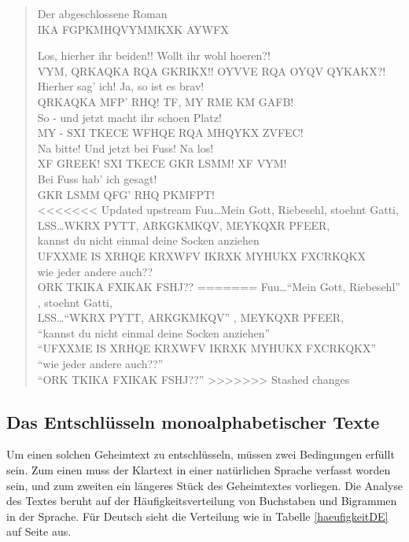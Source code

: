 \documentclass[%
<<<<<<< Updated upstream
11pt,%
twoside,%
titlepage,%
german,%
headsepline%
]{scrartcl}
\begin{document}
\begin{quote}
Der abgeschlossene Roman\\
IKA FGPKMHQVYMMKXK AYWFX

Los, hierher ihr beiden!! Wollt ihr wohl hoeren?!\\
VYM, QRKAQKA RQA GKRIKX!! OYVVE RQA OYQV QYKAKX?!\\
Hierher sag' ich! Ja, so ist es brav!\\
QRKAQKA MFP' RHQ! TF, MY RME KM GAFB!\\
So - und jetzt macht ihr schoen Platz!\\
MY - SXI TKECE WFHQE RQA MHQYKX ZVFEC!\\
Na bitte! Und jetzt bei Fuss! Na los!\\
XF GREEK! SXI TKECE GKR LSMM! XF VYM!\\
Bei Fuss hab' ich gesagt!\\
GKR LSMM QFG' RHQ PKMFPT!\\
<<<<<<< Updated upstream
Fuu\dots  \glqq Mein Gott, Riebesehl\glqq , stoehnt Gatti,\\
LSS\dots  \glqq WKRX PYTT, ARKGKMKQV\glqq , MEYKQXR PFEER,\\
\glqq kannst du nicht einmal deine Socken anziehen\\
\glqq UFXXME IS XRHQE KRXWFV IKRXK MYHUKX FXCRKQKX\\
 wie jeder andere auch??\glqq \\
 ORK TKIKA FXIKAK FSHJ??\glqq
=======
Fuu\dots  \enquote{Mein Gott, Riebesehl} , stoehnt Gatti,\\
LSS\dots  \enquote{WKRX PYTT, ARKGKMKQV} , MEYKQXR PFEER,\\
\enquote{kannst du nicht einmal deine Socken anziehen}\\
\enquote{UFXXME IS XRHQE KRXWFV IKRXK MYHUKX FXCRKQKX}\\
 \enquote{wie jeder andere auch??} \\
 \enquote{ORK TKIKA FXIKAK FSHJ??}
>>>>>>> Stashed changes
 

\end{quote}

\subsection{Das Entschlüsseln monoalphabetischer Texte}

Um einen solchen Geheimtext zu entschlüsseln, müssen zwei Bedingungen erfüllt sein. Zum einen muss der Klartext in einer natürlichen Sprache verfasst worden sein, und zum zweiten ein längeres Stück des Geheimtextes vorliegen. Die Analyse des Textes beruht auf der Häufigkeitsverteilung von Buchstaben und Bigrammen in der Sprache. Für Deutsch sieht die Verteilung wie in Tabelle \ref{haeufigkeitDE} auf Seite \pageref{haeufigkeitDE} aus.
\end{document}
